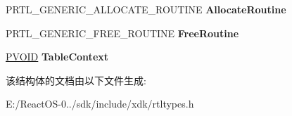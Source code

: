 \begin{DoxyCompactItemize}
\item 
\mbox{\label{struct___r_t_l___g_e_n_e_r_i_c___t_a_b_l_e_ab3e55817957011c2f4342971fccd5562}} 
P\+R\+T\+L\+\_\+\+G\+E\+N\+E\+R\+I\+C\+\_\+\+A\+L\+L\+O\+C\+A\+T\+E\+\_\+\+R\+O\+U\+T\+I\+NE {\bfseries Allocate\+Routine}
\item 
\mbox{\label{struct___r_t_l___g_e_n_e_r_i_c___t_a_b_l_e_a3ad3fa7dd635426b87f0b11ecf2d6517}} 
P\+R\+T\+L\+\_\+\+G\+E\+N\+E\+R\+I\+C\+\_\+\+F\+R\+E\+E\+\_\+\+R\+O\+U\+T\+I\+NE {\bfseries Free\+Routine}
\item 
\mbox{\label{struct___r_t_l___g_e_n_e_r_i_c___t_a_b_l_e_ae39772f4909176280762f29e4c55d845}} 
\hyperlink{interfacevoid}{P\+V\+O\+ID} {\bfseries Table\+Context}
\end{DoxyCompactItemize}


该结构体的文档由以下文件生成\+:\begin{DoxyCompactItemize}
\item 
E\+:/\+React\+O\+S-\/0../sdk/include/xdk/rtltypes.\+h\end{DoxyCompactItemize}
